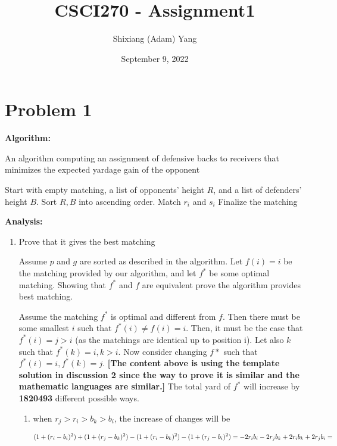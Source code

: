 \documentclass{article}
\author{Shixiang (Adam) Yang}
\date{September 9, 2022}
\title{CSCI270 - Assignment1}
\begin{document}
 \maketitle
\section{Problem 1}
    \textbf{Algorithm: }
    \begin{algorithm}
    \caption{An algorithm computing an assignment of defensive backs to receivers that minimizes the expected yardage gain of the opponent}\label{alg:cap}
    \begin{algorithmic}
    
    \State Start with empty matching, a list of opponents' height $R$, and a list of defenders' height $B$.
    \State Sort $R, B$ into ascending order.
        \State Match $r_i$ and $s_i$
    \EndFor
    \State Finalize the matching
    \end{algorithmic}
    \end{algorithm}


    \textbf{Analysis:}
    \begin{enumerate}
        \item Prove that it gives the best matching

        Assume $p$ and $g$ are sorted as described in the algorithm. Let $f(i)=i$ be the matching provided by our algorithm, and let $f^*$ be some optimal matching. Showing that $f^*$ and $f$ are equivalent prove the algorithm provides best matching.

        Assume the matching $f^*$ is optimal and different from $f$. Then there must be some smallest $i$ such that $f^*(i) \neq f(i) = i$. Then, it must be the case that $f^*(i) = j > i$ (as the matchings are identical up to position i). Let also $k$ such that $f^*(k) = i, k > i$. Now consider changing $f*$ such that $f^*(i)=i, f^*(k)=j$. \textbf{[The content above is using the template solution in discussion 2 since the way to prove it is similar and the mathematic languages are similar.]} The total yard of $f^*$ will increase by \textbf{1820493} different possible ways.
        \begin{enumerate}
            \item when $r_j > r_i > b_k > b_i$, the increase of changes will be
            
            \begin{dmath}
                   (1+(r_i-b_i)^2) + (1+(r_j-b_k)^2) - (1+(r_i-b_k)^2) - (1+(r_j-b_i)^2)
                   \\
                   = -2r_ib_i-2r_jb_k+2r_ib_k+2r_jb_i
                   \\
                   =
            \end{dmath}
         
        \end{enumerate}
        
    \end{enumerate}
\end{document}
